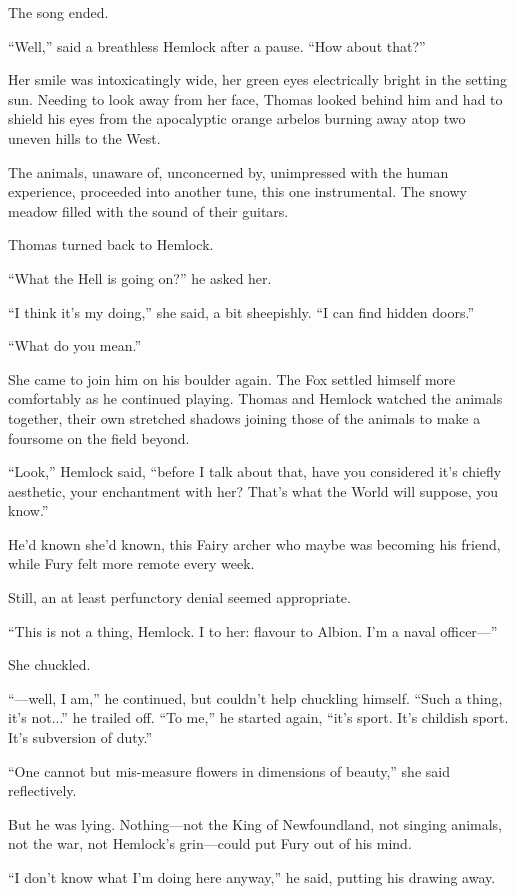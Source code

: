 \documentclass[11pt,a5paper]{article}
\begin{document}
The song ended.

``Well,'' said a breathless Hemlock after a pause. ``How about that?''

Her smile was intoxicatingly wide, her green eyes electrically bright in the setting sun. Needing to look away from her face, Thomas looked behind him and had to shield his eyes from the apocalyptic orange arbelos burning away atop two uneven hills to the West.

The animals, unaware of, unconcerned by, unimpressed with the human experience, proceeded into another tune, this one instrumental. The snowy meadow filled with the sound of their guitars.

Thomas turned back to Hemlock.

``What the Hell is going on?'' he asked her.

``I think it's my doing,'' she said, a bit sheepishly. ``I can find hidden doors.''

``What do you mean.''

She came to join him on his boulder again. The Fox settled himself more comfortably as he continued playing. Thomas and Hemlock watched the animals together, their own stretched shadows joining those of the animals to make a foursome on the field beyond.

``Look,'' Hemlock said, ``before I talk about that, have you considered it's chiefly aesthetic, your enchantment with her? That's what the World will suppose, you know.''

He'd known she'd known, this Fairy archer who maybe was becoming his friend, while Fury felt more remote every week.

Still, an at least perfunctory denial seemed appropriate.

``This is not a thing, Hemlock. I to her: flavour to Albion. I'm a naval officer---''

She chuckled.

``---well, I am,'' he continued, but couldn't help chuckling himself. ``Such a thing, it's not...'' he trailed off. ``To me,'' he started again, ``it's sport. It's childish sport. It's subversion of duty.''

``One cannot but mis-measure flowers in dimensions of beauty,'' she said reflectively.

But he was lying. Nothing---not the King of Newfoundland, not singing animals, not the war, not Hemlock's grin---could put Fury out of his mind.

``I don't know what I'm doing here anyway,'' he said, putting his drawing away.
\end{document}
